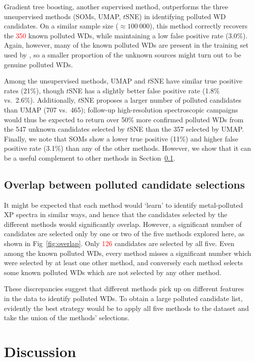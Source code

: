 \documentclass[fleqn,usenatbib]{rasti}
\newcommand{\red}[1]{\textcolor{red}{#1}}
\begin{document}
Gradient tree boosting, another supervised method, outperforms the three unsupervised methods (SOMs, UMAP, $t$SNE) in identifying polluted WD candidates.
On a similar sample size ($\approx 100~000$), this method correctly recovers the \red{350} known polluted WDs, while maintaining a low false positive rate ($3.0\%$).
Again, however, many of the known polluted WDs are present in the training set used by \citet{vincent24}, so a smaller proportion of the unknown sources might turn out to be genuine polluted WDs.

Among the unsupervised methods, UMAP and $t$SNE have similar true positive rates (21\%), though $t$SNE has a slightly better false positive rate (1.8\% vs.\ 2.6\%).
Additionally, $t$SNE proposes a larger number of polluted candidates than UMAP (707 vs.\ 465); follow-up high-resolution spectroscopic campaigns would thus be expected to return over 50\% more confirmed polluted WDs from the 547 unknown candidates selected by $t$SNE than the 357 selected by UMAP.
Finally, we note that SOMs show a lower true positive (11\%) and higher false positive rate (3.1\%) than any of the other methods.
However, we show that it can be a useful complement to other methods in Section~\ref{sec:results/overlap}.


\subsection{Overlap between polluted candidate selections} \label{sec:results/overlap}

It might be expected that each method would `learn' to identify metal-polluted XP spectra in similar ways, and hence that the candidates selected by the different methods would significantly overlap.
However, a significant number of candidates are selected only by one or two of the five methods explored here, as shown in Fig~\ref{fig:overlap}.
Only \red{126} candidates are selected by all five.
Even among the known polluted WDs, every method misses a significant number which were selected by at least one other method, and conversely each method selects some known polluted WDs which are not selected by any other method.

These discrepancies suggest that different methods pick up on different features in the data to identify polluted WDs.
To obtain a large polluted candidate list, evidently the best strategy would be to apply all five methods to the dataset and take the union of the methods' selections.


\section{Discussion} \label{sec:discussion}
\end{document}
